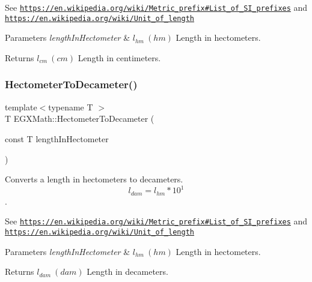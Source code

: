 See \href{https://en.wikipedia.org/wiki/Metric_prefix#List_of_SI_prefixes}{\tt https\+://en.\+wikipedia.\+org/wiki/\+Metric\+\_\+prefix\#\+List\+\_\+of\+\_\+\+S\+I\+\_\+prefixes} and \href{https://en.wikipedia.org/wiki/Unit_of_length}{\tt https\+://en.\+wikipedia.\+org/wiki/\+Unit\+\_\+of\+\_\+length} 
\begin{DoxyParams}{Parameters}
{\em length\+In\+Hectometer} & $ l_{hm}\ (hm)$ Length in hectometers. \\
\hline
\end{DoxyParams}
\begin{DoxyReturn}{Returns}
$ l_{cm}\ (cm)$ Length in centimeters. 
\end{DoxyReturn}
\mbox{\label{group___e_g_x_math-_conversions-_length_conversions-_hectometer-_s_i_gae1f538c996355305fea9022a6325dab0}} 
\subsubsection{\texorpdfstring{Hectometer\+To\+Decameter()}{HectometerToDecameter()}}
{\footnotesize\ttfamily template$<$typename T $>$ \\
T E\+G\+X\+Math\+::\+Hectometer\+To\+Decameter (\begin{DoxyParamCaption}\item[{const T}]{length\+In\+Hectometer }\end{DoxyParamCaption})}



Converts a length in hectometers to decameters. \[ l_{dam}=l_{hm} * 10^{1} \]. 

See \href{https://en.wikipedia.org/wiki/Metric_prefix#List_of_SI_prefixes}{\tt https\+://en.\+wikipedia.\+org/wiki/\+Metric\+\_\+prefix\#\+List\+\_\+of\+\_\+\+S\+I\+\_\+prefixes} and \href{https://en.wikipedia.org/wiki/Unit_of_length}{\tt https\+://en.\+wikipedia.\+org/wiki/\+Unit\+\_\+of\+\_\+length} 
\begin{DoxyParams}{Parameters}
{\em length\+In\+Hectometer} & $ l_{hm}\ (hm)$ Length in hectometers. \\
\hline
\end{DoxyParams}
\begin{DoxyReturn}{Returns}
$ l_{dam}\ (dam)$ Length in decameters. 
\end{DoxyReturn}
\mbox{\label{group___e_g_x_math-_conversions-_length_conversions-_hectometer-_s_i_ga41bf480cfd5b36671453de373251d171}} 
